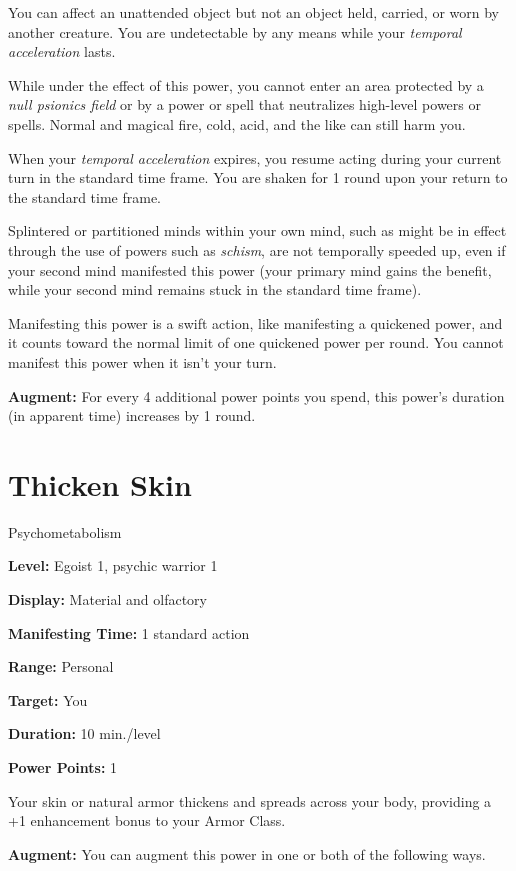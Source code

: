 \documentclass{article}
\begin{document}
You can affect an unattended object but not an object held, carried, or worn by 
another creature. You are undetectable by any means while your \textit{temporal 
acceleration }lasts.

While under the effect of this power, you cannot enter an area protected by a \textit{null 
psionics field }or by a power or spell that neutralizes high-level powers or spells. 
Normal and magical fire, cold, acid, and the like can still harm you.

When your \textit{temporal acceleration }expires, you resume acting during your 
current turn in the standard time frame. You are shaken for 1 round upon your return 
to the standard time frame.

Splintered or partitioned minds within your own mind, such as might be in effect 
through the use of powers such as \textit{schism}, are not temporally speeded up, 
even if your second mind manifested this power (your primary mind gains the benefit, 
while your second mind remains stuck in the standard time frame).

Manifesting this power is a swift action, like manifesting a quickened power, and 
it counts toward the normal limit of one quickened power per round. You cannot 
manifest this power when it isn't your turn.

\textbf{Augment:} For every 4 additional power points you spend, this power's duration 
(in apparent time) increases by 1 round.

\vspace{12pt}
\section*{Thicken Skin}

Psychometabolism

\textbf{Level:} Egoist 1, psychic warrior 1

\textbf{Display:} Material and olfactory

\textbf{Manifesting Time:} 1 standard action

\textbf{Range:} Personal

\textbf{Target:} You

\textbf{Duration:} 10 min./level

\textbf{Power Points:} 1

Your skin or natural armor thickens and spreads across your body, providing a +1 
enhancement bonus to your Armor Class.

\textbf{Augment:} You can augment this power in one or both of the following ways.
\end{document}
